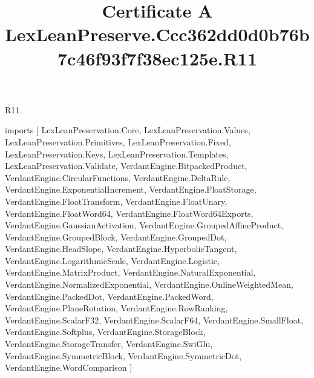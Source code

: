 \begin{lexlean}{R11}
\title{Certificate A LexLeanPreserve.Ccc362dd0d0b76b7c46f93f7f38ec125e.R11}
\begin{coremodule}
imports [
  LexLeanPreservation.Core,
  LexLeanPreservation.Values,
  LexLeanPreservation.Primitives,
  LexLeanPreservation.Fixed,
  LexLeanPreservation.Keys,
  LexLeanPreservation.Templates,
  LexLeanPreservation.Validate,
  VerdantEngine.BitpackedProduct,
  VerdantEngine.CircularFunctions,
  VerdantEngine.DeltaRule,
  VerdantEngine.ExponentialIncrement,
  VerdantEngine.FloatStorage,
  VerdantEngine.FloatTransform,
  VerdantEngine.FloatUnary,
  VerdantEngine.FloatWord64,
  VerdantEngine.FloatWord64Exports,
  VerdantEngine.GaussianActivation,
  VerdantEngine.GroupedAffineProduct,
  VerdantEngine.GroupedBlock,
  VerdantEngine.GroupedDot,
  VerdantEngine.HeadSlope,
  VerdantEngine.HyperbolicTangent,
  VerdantEngine.LogarithmicScale,
  VerdantEngine.Logistic,
  VerdantEngine.MatrixProduct,
  VerdantEngine.NaturalExponential,
  VerdantEngine.NormalizedExponential,
  VerdantEngine.OnlineWeightedMean,
  VerdantEngine.PackedDot,
  VerdantEngine.PackedWord,
  VerdantEngine.PlaneRotation,
  VerdantEngine.RowRanking,
  VerdantEngine.ScalarF32,
  VerdantEngine.ScalarF64,
  VerdantEngine.SmallFloat,
  VerdantEngine.Softplus,
  VerdantEngine.StorageBlock,
  VerdantEngine.StorageTransfer,
  VerdantEngine.SwiGlu,
  VerdantEngine.SymmetricBlock,
  VerdantEngine.SymmetricDot,
  VerdantEngine.WordComparison
]


\end{coremodule}
\end{lexlean}
